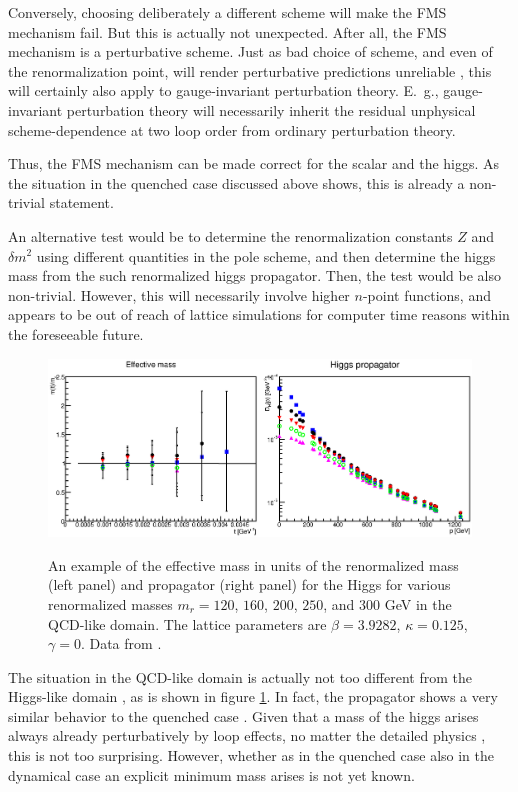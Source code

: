\documentclass[final,12pt,3p,longtitle]{elsarticle}
\newcommand*{\1}{1\!\!\!\bot}
\begin{document}
Conversely, choosing deliberately a different scheme will make the FMS mechanism fail. But this is actually not unexpected. After all, the FMS mechanism is a perturbative scheme. Just as bad choice of scheme, and even of the renormalization point, will render perturbative predictions unreliable \cite{BeiglboCk:2006lfa,Baglio:2011wn,Baglio:2011hc}, this will certainly also apply to gauge-invariant perturbation theory. E.\ g., gauge-invariant perturbation theory will necessarily inherit the residual unphysical scheme-dependence at two loop order from ordinary perturbation theory.

Thus, the FMS mechanism can be made correct for the scalar and the higgs. As the situation in the quenched case discussed above shows, this is already a non-trivial statement.

An alternative test would be to determine the renormalization constants $Z$ and $\delta m^2$ using different quantities in the pole scheme, and then determine the higgs mass from the such renormalized higgs propagator. Then, the test would be also non-trivial. However, this will necessarily involve higher $n$-point functions, and appears to be out of reach of lattice simulations for computer time reasons within the foreseeable future.

\begin{figure}
\includegraphics[width=\linewidth]{h-qcd}\\
\caption{\label{fig:h-qcd}An example of the effective mass in units of the renormalized mass (left panel) and propagator (right panel) for the Higgs for various renormalized masses $m_r=120$, $160$, $200$, $250$, and $300$ GeV in the QCD-like domain. The lattice parameters are $\beta=3.9282$, $\kappa=0.125$, $\gamma=0$. Data from \cite{Maas:2013aia,Maas:unpublished}.}
\end{figure}

The situation in the QCD-like domain is actually not too different from the Higgs-like domain \cite{Benes:2008ir,Fister:2010yw,Gies:2015lia,Maas:2013aia}, as is shown in figure \ref{fig:h-qcd}. In fact, the propagator shows a very similar behavior to the quenched case \cite{Maas:2016edk}. Given that a mass of the higgs arises always already perturbatively by loop effects, no matter the detailed physics \cite{Bohm:2001yx}, this is not too surprising. However, whether as in the quenched case also in the dynamical case an explicit minimum mass arises is not yet known.
\end{document}

